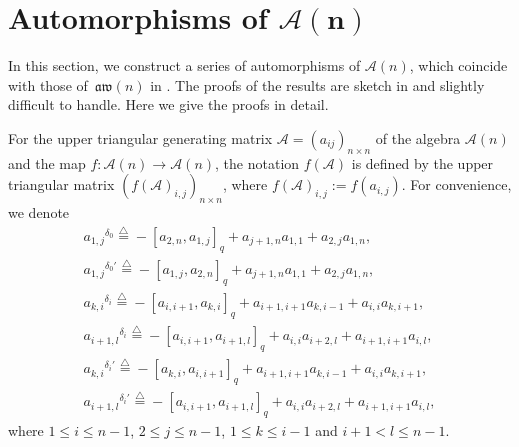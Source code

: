 \documentclass[10pt,a4paper]{amsart}
\numberwithin{equation}{section}
\def\lrb#1{\left(#1\right)}
\def\lq#1{\left[#1\right]_q}
\def\d{\delta}
\def\A{\mathscr{A}}
\def\aw{\mathfrak{aw}}
\begin{document}
\section[Automorphisms of A(n)]{Automorphisms of $\boldsymbol{\A(n)}$}\label{sect:automorphism}

In this section, we construct a series of automorphisms of $\A(n)$,
which coincide with those of~$\aw(n)$ in \cite{CFPR(2023)}.
The proofs of the results are sketch in \cite{CFPR(2023)} and slightly difficult to handle.
Here we give the proofs in detail.

For the upper triangular generating matrix $\A=(a_{ij})_{n\times n}$ of the algebra $\A(n)$ and the map $f\colon \A(n)\to \A(n)$, the notation $f\lrb{\A}$ is defined by the upper triangular matrix $(f\lrb{\A}_{i,j})_{n\times n}$, where $f\lrb{\A}_{i,j}:=f\lrb{a_{i,j}}$.
For convenience, we denote
\begin{gather}%
 {a_{1,j}}^{\d_0}\overset{\bigtriangleup}{=} -\lq{a_{2,n}, a_{1,j}}+a_{j+1,n}a_{1,1}+a_{2,j}a_{1,n}, \label{eqn:r0} \\
 {a_{1,j}}^{\d_0'}\overset{\bigtriangleup}{=} -\lq{a_{1,j}, a_{2,n}}+a_{j+1,n}a_{1,1}+a_{2,j}a_{1,n}, \\
 {a_{k,i}}^{\d_i}\overset{\bigtriangleup}{=} -\lq{a_{i,i+1}, a_{k,i}}+a_{i+1,i+1}a_{k,i-1}+a_{i,i}a_{k,i+1}, \label{eqn:ri} \\
 {a_{i+1, l}}^{\d_i}\overset{\bigtriangleup}{=} -\lq{a_{i,i+1}, a_{i+1, l}}+a_{i,i}a_{i+2,l}+a_{i+1,i+1}a_{i,l}, \label{eqn:ri+1}\\
 {a_{k,i}}^{\d_i'}\overset{\bigtriangleup}{=} -\lq{a_{k,i}, a_{i,i+1}}+a_{i+1,i+1}a_{k,i-1}+a_{i,i}a_{k,i+1}, \\
 {a_{i+1, l}}^{\d_i'}\overset{\bigtriangleup}{=} -\lq{a_{i,i+1}, a_{i+1, l}} +a_{i,i}a_{i+2,l} +a_{i+1,i+1}a_{i,l},
\end{gather}
where $1\leq i\leq n-1$, $2\leq j\leq n-1$, $1 \leq k \leq i-1$ and $i+1<l\leq n-1.$
\end{document}
